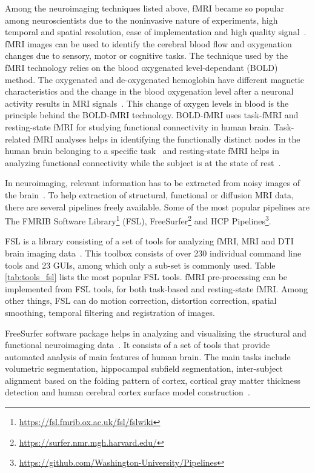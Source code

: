 Among the neuroimaging techniques listed above, fMRI became so popular among neuroscientists due to the noninvasive nature of experiments, high temporal and spatial resolution, ease of implementation and high quality signal~\cite{Bandettini2009}. fMRI images can be used to identify the cerebral blood flow and oxygenation changes due to sensory, motor or cognitive tasks. The technique used by the fMRI technology relies on the blood oxygenated level-dependant (BOLD) method. The oxygenated and de-oxygenated hemoglobin have different magnetic characteristics and the change in the blood oxygenation level after a neuronal activity results in MRI signals~\cite{doi:10.1177/0883073807313047}. This change of oxygen levels in blood is the principle behind the BOLD-fMRI technology. BOLD-fMRI uses task-fMRI and resting-state fMRI for studying functional connectivity in human brain. Task-related fMRI analyses helps in identifying the functionally distinct nodes in the human brain belonging to a specific task~\cite{task_fmri} and resting-state fMRI helps in analyzing functional connectivity while the subject is at the state of rest~\cite{SMITH2013144}.

In neuroimaging, relevant information has to be extracted from noisy images of the brain~\cite{WOOLRICH2009S173}. To help extraction of structural, functional or diffusion MRI data, there are several pipelines freely available. Some of the most popular pipelines are The FMRIB Software Library\footnote{\url{https://fsl.fmrib.ox.ac.uk/fsl/fslwiki}} (FSL), FreeSurfer\footnote{\url{https://surfer.nmr.mgh.harvard.edu/}} and HCP Pipelines\footnote{\url{https://github.com/Washington-University/Pipelines}}.
 
FSL is a library consisting of a set of tools for analyzing fMRI, MRI and DTI brain imaging data~\cite{JENKINSON2012782}. This toolbox consists of over 230 individual command line tools and 23 GUIs, among which only a sub-set is commonly used. Table \ref{tab:tools_fsl} lists the most popular FSL tools. fMRI pre-processing can be implemented from FSL tools, for both task-based and resting-state fMRI. Among other things, FSL can do motion correction, distortion correction, spatial smoothing, temporal filtering and registration of images.

FreeSurfer software package helps in analyzing and visualizing the structural and functional neuroimaging data~\cite{freesurfer_website}. It consists of a set of tools that provide automated analysis of main features of human brain. The main tasks include volumetric segmentation, hippocampal subfield segmentation, inter-subject alignment based on the folding pattern of cortex, cortical gray matter thickness detection and human cerebral cortex surface model construction~\cite{Fischl2012}. 

